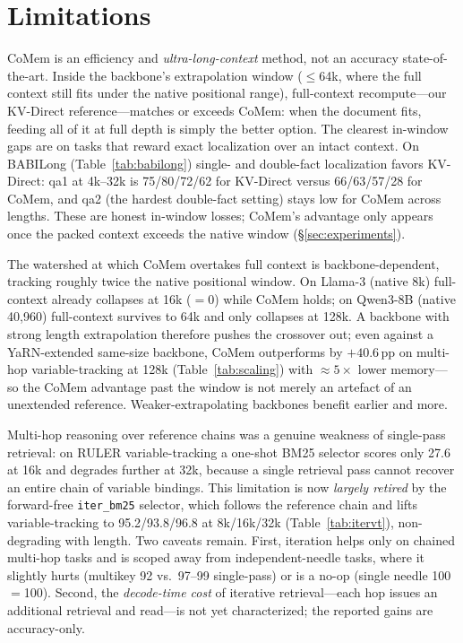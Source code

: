\section{Limitations}
\label{sec:limitations}

CoMem is an efficiency and \emph{ultra-long-context} method, not an
accuracy state-of-the-art. Inside the backbone's extrapolation window
($\le$64k, where the full context still fits under the native positional
range), full-context recompute---our KV-Direct reference---matches or
exceeds CoMem: when the document fits, feeding all of it at full depth is
simply the better option. The clearest in-window gaps are on tasks that
reward exact localization over an intact context. On BABILong
(Table~\ref{tab:babilong}) single- and double-fact localization favors
KV-Direct: qa1 at 4k--32k is 75/80/72/62 for KV-Direct versus 66/63/57/28
for CoMem, and qa2 (the hardest double-fact setting) stays low for CoMem
across lengths. These are honest in-window losses; CoMem's advantage only
appears once the packed context exceeds the native window (\S\ref{sec:experiments}).

The watershed at which CoMem overtakes full context is backbone-dependent,
tracking roughly twice the native positional window. On Llama-3
\citep{llama3} (native 8k) full-context already collapses at 16k
($=$0) while CoMem holds; on Qwen3-8B \citep{qwen3} (native 40{,}960)
full-context survives to 64k and only collapses at 128k. A backbone with
strong length extrapolation therefore pushes the crossover out; even against
a YaRN-extended same-size backbone, CoMem outperforms by $+40.6$\,pp on
multi-hop variable-tracking at 128k (Table~\ref{tab:scaling}) with
${\approx}5\times$ lower memory---so the CoMem advantage past the window
is not merely an artefact of an unextended reference.
Weaker-extrapolating backbones benefit earlier and more.

Multi-hop reasoning over reference chains was a genuine weakness of
single-pass retrieval: on RULER variable-tracking a one-shot BM25 selector
scores only 27.6 at 16k and degrades further at 32k, because a single
retrieval pass cannot recover an entire chain of variable bindings. This
limitation is now \emph{largely retired} by the forward-free
\texttt{iter\_bm25} selector, which follows the reference chain and lifts
variable-tracking to 95.2/93.8/96.8 at 8k/16k/32k (Table~\ref{tab:itervt}),
non-degrading with length. Two caveats remain. First, iteration helps only
on chained multi-hop tasks and is scoped away from independent-needle tasks,
where it slightly hurts (multikey 92 vs.\ 97--99 single-pass) or is a no-op
(single needle 100$=$100). Second, the \emph{decode-time cost} of iterative
retrieval---each hop issues an additional retrieval and read---is not yet
characterized; the reported gains are accuracy-only.

